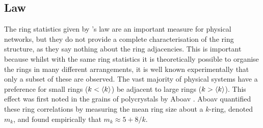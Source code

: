 
\subsection{\aw{} Law}
\label{s:awlaw}

The ring statistics given by \lm's law are an important measure for physical networks, but they do not provide a complete characterisation of the ring structure, as they say nothing about the ring adjacencies. 
This is important because whilst with the same ring statistics it is theoretically possible to organise the rings in many different arrangements, it is well known experimentally that only a subset of these are observed.
The vast majority of physical systems have a preference for small rings ($k<\langle k \rangle$) be adjacent to large rings ($k>\langle k \rangle$).
This effect was first noted in the grains of polycrystals by Aboav \cite{Aboav1970}.
Aboav quantified these ring correlations by measuring the mean ring size about a $k$\--ring, denoted $m_k$, and found empirically that $m_k \approx 5 + 8/k$.

